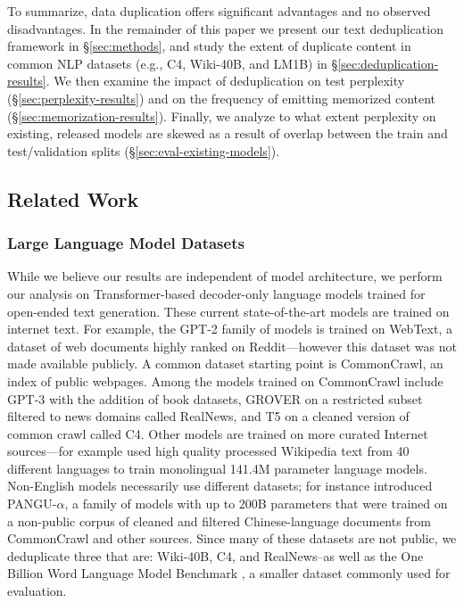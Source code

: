To summarize, data duplication offers significant advantages and no observed disadvantages.
In the remainder of this paper we present our text deduplication framework in \S\ref{sec:methods}, and study the extent of duplicate content in common NLP datasets (e.g., C4, Wiki-40B, and LM1B) in \S\ref{sec:deduplication-results}.
We then examine the impact of deduplication on test perplexity (\S\ref{sec:perplexity-results}) and on the frequency of emitting memorized content (\S\ref{sec:memorization-results}).
Finally, we analyze to what extent perplexity on existing, released models are skewed as a result of overlap between the train and test/validation splits (\S\ref{sec:eval-existing-models}).

\subsection{Related Work}
\subsubsection{Large Language Model Datasets}
While we believe our results are independent of model architecture,
we perform our analysis on Transformer-based decoder-only language models \citep{vaswani2017attention} trained for open-ended text generation.
These current state-of-the-art models are trained on internet text.
For example, the GPT-2 family of models \citet{radford2019language} is trained on WebText, a dataset of web documents highly ranked on Reddit---however this dataset was not made available publicly.
A common dataset starting point is CommonCrawl, an index of public webpages.
Among the models trained on CommonCrawl include
GPT-3 \cite{brown2020language} with the addition of book datasets,
GROVER \cite{zellers2019defending} on a restricted subset filtered to news domains called RealNews,
and T5 \cite{raffel2019exploring} on a cleaned version of common crawl called C4.
Other models are trained on more curated Internet sources---for example \citet{guo2020wiki40b} used high quality processed Wikipedia text from 40 different languages to train monolingual 141.4M parameter language models.
Non-English models necessarily use different datasets; \citet{zeng2021pangualpha} for instance introduced PANGU-$\alpha$, a family of models with up to 200B parameters that were trained on a non-public corpus of cleaned and filtered Chinese-language documents from CommonCrawl and other sources.
Since many of these datasets are not public,
we deduplicate three that are: Wiki-40B, C4, and RealNews--as well as the One Billion Word Language Model Benchmark \citep{chelba2013one}, 
a smaller
dataset commonly used for evaluation.

